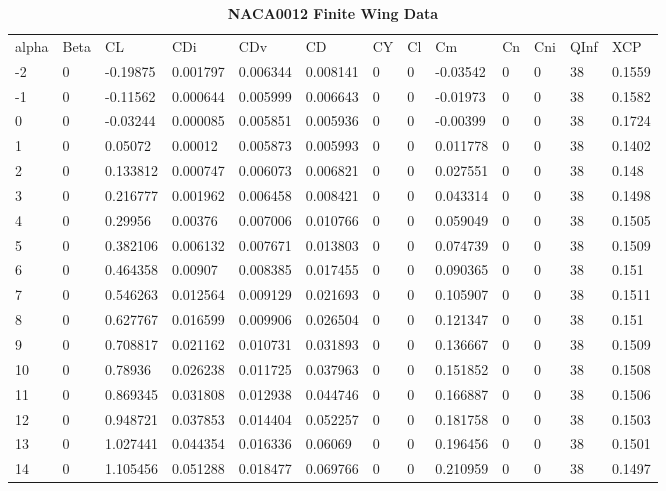 \begin{singlespace}
\begin{table}[H]
\caption{\textbf{NACA0012 Finite Wing Data}} \label{table:NACA0012_finite}
\begin{tabular}{|l|l|l|l|l|l|l|l|l|l|l|l|l|}
alpha & Beta & CL       & CDi      & CDv      & CD       & CY & Cl & Cm       & Cn & Cni & QInf & XCP    \\
-2    & 0    & -0.19875 & 0.001797 & 0.006344 & 0.008141 & 0  & 0  & -0.03542 & 0  & 0   & 38   & 0.1559 \\
-1    & 0    & -0.11562 & 0.000644 & 0.005999 & 0.006643 & 0  & 0  & -0.01973 & 0  & 0   & 38   & 0.1582 \\
0     & 0    & -0.03244 & 0.000085 & 0.005851 & 0.005936 & 0  & 0  & -0.00399 & 0  & 0   & 38   & 0.1724 \\
1     & 0    & 0.05072  & 0.00012  & 0.005873 & 0.005993 & 0  & 0  & 0.011778 & 0  & 0   & 38   & 0.1402 \\
2     & 0    & 0.133812 & 0.000747 & 0.006073 & 0.006821 & 0  & 0  & 0.027551 & 0  & 0   & 38   & 0.148  \\
3     & 0    & 0.216777 & 0.001962 & 0.006458 & 0.008421 & 0  & 0  & 0.043314 & 0  & 0   & 38   & 0.1498 \\
4     & 0    & 0.29956  & 0.00376  & 0.007006 & 0.010766 & 0  & 0  & 0.059049 & 0  & 0   & 38   & 0.1505 \\
5     & 0    & 0.382106 & 0.006132 & 0.007671 & 0.013803 & 0  & 0  & 0.074739 & 0  & 0   & 38   & 0.1509 \\
6     & 0    & 0.464358 & 0.00907  & 0.008385 & 0.017455 & 0  & 0  & 0.090365 & 0  & 0   & 38   & 0.151  \\
7     & 0    & 0.546263 & 0.012564 & 0.009129 & 0.021693 & 0  & 0  & 0.105907 & 0  & 0   & 38   & 0.1511 \\
8     & 0    & 0.627767 & 0.016599 & 0.009906 & 0.026504 & 0  & 0  & 0.121347 & 0  & 0   & 38   & 0.151  \\
9     & 0    & 0.708817 & 0.021162 & 0.010731 & 0.031893 & 0  & 0  & 0.136667 & 0  & 0   & 38   & 0.1509 \\
10    & 0    & 0.78936  & 0.026238 & 0.011725 & 0.037963 & 0  & 0  & 0.151852 & 0  & 0   & 38   & 0.1508 \\
11    & 0    & 0.869345 & 0.031808 & 0.012938 & 0.044746 & 0  & 0  & 0.166887 & 0  & 0   & 38   & 0.1506 \\
12    & 0    & 0.948721 & 0.037853 & 0.014404 & 0.052257 & 0  & 0  & 0.181758 & 0  & 0   & 38   & 0.1503 \\
13    & 0    & 1.027441 & 0.044354 & 0.016336 & 0.06069  & 0  & 0  & 0.196456 & 0  & 0   & 38   & 0.1501 \\
14    & 0    & 1.105456 & 0.051288 & 0.018477 & 0.069766 & 0  & 0  & 0.210959 & 0  & 0   & 38   & 0.1497 
\end{tabular}
\end{table}


\end{singlespace}
